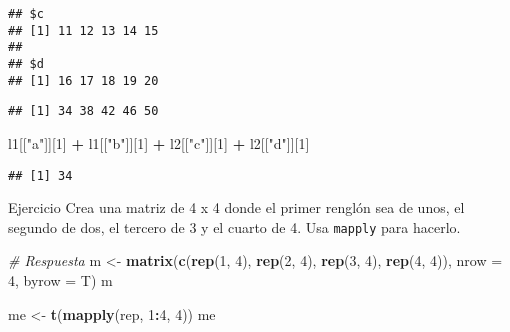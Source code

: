 \documentclass[]{article}
\newenvironment{Shaded}{\begin{snugshade}}{\end{snugshade}}
\newcommand{\KeywordTok}[1]{\textcolor[rgb]{0.13,0.29,0.53}{\textbf{#1}}}
\newcommand{\DataTypeTok}[1]{\textcolor[rgb]{0.13,0.29,0.53}{#1}}
\newcommand{\DecValTok}[1]{\textcolor[rgb]{0.00,0.00,0.81}{#1}}
\newcommand{\StringTok}[1]{\textcolor[rgb]{0.31,0.60,0.02}{#1}}
\newcommand{\CommentTok}[1]{\textcolor[rgb]{0.56,0.35,0.01}{\textit{#1}}}
\newcommand{\OperatorTok}[1]{\textcolor[rgb]{0.81,0.36,0.00}{\textbf{#1}}}
\newcommand{\NormalTok}[1]{#1}
\begin{document}
\begin{verbatim}
## $c
## [1] 11 12 13 14 15
## 
## $d
## [1] 16 17 18 19 20
\end{verbatim}

\begin{Shaded}
\end{Shaded}

\begin{verbatim}
## [1] 34 38 42 46 50
\end{verbatim}

\begin{Shaded}
\begin{Highlighting}[]
\NormalTok{l1[[}\StringTok{"a"}\NormalTok{]][}\DecValTok{1}\NormalTok{] }\OperatorTok{+}\StringTok{ }\NormalTok{l1[[}\StringTok{"b"}\NormalTok{]][}\DecValTok{1}\NormalTok{] }\OperatorTok{+}\StringTok{ }\NormalTok{l2[[}\StringTok{"c"}\NormalTok{]][}\DecValTok{1}\NormalTok{] }\OperatorTok{+}\StringTok{ }\NormalTok{l2[[}\StringTok{"d"}\NormalTok{]][}\DecValTok{1}\NormalTok{]}
\end{Highlighting}
\end{Shaded}

\begin{verbatim}
## [1] 34
\end{verbatim}

\renewcommand\bcStyleTitre[1]{\large\textcolor{bbblack}{#1}}

\begin{bclogo}[
  couleur=llred,
  arrondi=0,
  logo=\bcstop,
  barre=none,
  noborder=true]{Ejercicio}
Crea una matriz de 4 x 4 donde el primer renglón sea de unos, el segundo de dos,
el tercero de 3 y el cuarto de 4. Usa \texttt{mapply} para hacerlo.
\end{bclogo}

\begin{Shaded}
\begin{Highlighting}[]
\CommentTok{# Respuesta}
\NormalTok{m <-}\StringTok{ }\KeywordTok{matrix}\NormalTok{(}\KeywordTok{c}\NormalTok{(}\KeywordTok{rep}\NormalTok{(}\DecValTok{1}\NormalTok{, }\DecValTok{4}\NormalTok{), }\KeywordTok{rep}\NormalTok{(}\DecValTok{2}\NormalTok{, }\DecValTok{4}\NormalTok{), }\KeywordTok{rep}\NormalTok{(}\DecValTok{3}\NormalTok{, }\DecValTok{4}\NormalTok{), }\KeywordTok{rep}\NormalTok{(}\DecValTok{4}\NormalTok{, }\DecValTok{4}\NormalTok{)), }\DataTypeTok{nrow =} \DecValTok{4}\NormalTok{, }\DataTypeTok{byrow =}\NormalTok{ T)}
\NormalTok{m}

\NormalTok{me <-}\StringTok{ }\KeywordTok{t}\NormalTok{(}\KeywordTok{mapply}\NormalTok{(rep, }\DecValTok{1}\OperatorTok{:}\DecValTok{4}\NormalTok{, }\DecValTok{4}\NormalTok{))}
\NormalTok{me}
\end{Highlighting}
\end{Shaded}
\end{document}
